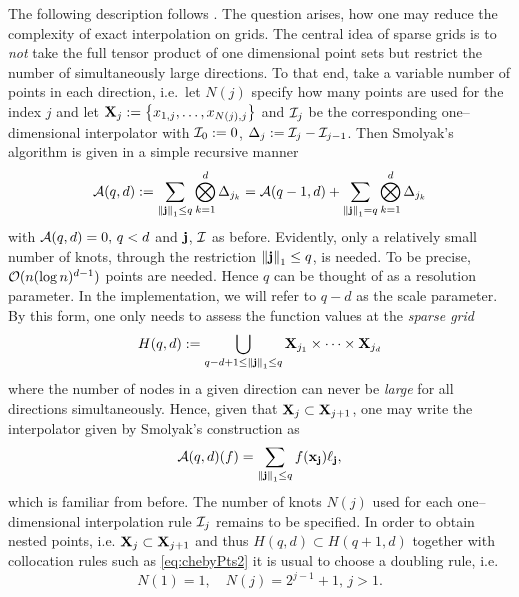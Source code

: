 \documentclass[12pt, oneside]{amsart}
\theoremstyle{definition}
\theoremstyle{remark}
\numberwithin{equation}{section}
\begin{document}
The following description follows \cite{BarthelmannHighDim_2000}.
The question arises, how one may reduce the complexity of exact interpolation 
on grids. The central idea of sparse grids is to \emph{not} take the full 
tensor product of one dimensional point sets but restrict the number of 
simultaneously large directions. To that end, take a variable 
number of points in each direction, i.e.\ let \(N(j)\) specify how many points are used for the index \(j\) and let \(\XX_j \defn \set{x_{1, j}, \dots, x_{N(j), j}}\) and \(\cI_j\) be the corresponding one--dimensional 
interpolator with \(\cI_0 \defn 0\), \(\Delta_j \defn \cI_j - \cI_{j-1}\). Then Smolyak's algorithm is given in a simple recursive 
manner
\begin{equation}\label{Smolyak}
	\cA(q, d) \defn \sum_{\norm[1]{\bfj} \leq q} \bigotimes_{k=1}^d 
	\Delta_{j_k} = \cA(q-1, d)+\sum_{\norm[1]{\bfj}=q} \bigotimes_{k=1}^d 
	\Delta_{j_k}
\end{equation}
with \(\cA(q, d) = 0,\, q < d\) and \(\bfj\), \(\cI\) as before. Evidently, 
only a relatively small number of knots, through the restriction 
\(\norm[1]{\bfj} \leq q\), is needed. To be precise, \(\cO(n (\log n)^{d-1})\) 
points are needed. Hence \(q\) can be thought of 
as a resolution parameter. In the implementation, we will refer to \(q-d\) as the scale parameter. By 
this form, one only needs to assess the function values at the \emph{sparse 
grid} \[
H(q, d) \defn \bigcup_{q-d+1 \leq \norm[1]{\bfj} \leq q} \XX_{j_1} \times 
\cdots \times \XX_{j_d}
\]
where the number of nodes in a given direction can never be \emph{large} for 
all directions simultaneously. Hence, given that \(\XX_j \subset \XX_{j+1}\), 
one may write the interpolator given by Smolyak's construction as \[
\cA(q, d)(f) = \sum_{\norm[1]{\bfj} \leq q} f(\bfx_\bfj) \ell_\bfj,
\]
which is familiar from before.
The number of knots \(N(j)\) used for each one--dimensional interpolation rule 
\(\cI_j\) remains to be specified. In order to obtain nested points, i.e. 
\(\XX_j \subset \XX_{j+1}\) and thus \(H(q, d) \subset H(q+1,d)\) together with 
collocation rules such as \cref{eq:chebyPts2} 
it is usual to choose a doubling rule, i.e. \[
N(1) = 1,\quad N(j) = 2^{j-1}+1,\, j > 1.
\]
\end{document}
